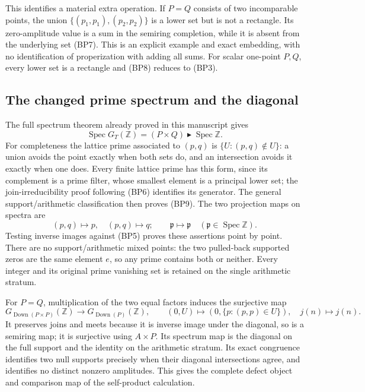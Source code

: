 \documentclass[11pt,a4paper]{article}
\theoremstyle{definition}\newtheorem{definition}[theorem]{Definition}
\begin{document}
This identifies a material extra operation. If $P=Q$ consists of
two incomparable points, the union
$\{(p_1,p_1),(p_2,p_2)\}$ is a lower set but is not a rectangle.
Its zero-amplitude value is a sum in the semiring completion, while
it is absent from the underlying set (BP7). This is an explicit
example and exact embedding, with no identification of properization
with adding all sums. For scalar one-point $P,Q$, every lower set
is a rectangle and (BP8) reduces to (BP3).

\subsection{The changed prime spectrum and the diagonal}

The full spectrum theorem already proved in this manuscript gives
\[
 \operatorname{Spec}G_T(\mathbb Z)
     =(P\times Q)\mathbin{\blacktriangleright}\operatorname{Spec}\mathbb Z.
 \tag{BP9}
\]
For completeness the lattice prime associated to $(p,q)$ is
$\{U:(p,q)\notin U\}$: a union avoids the point exactly when
both sets do, and an intersection avoids it exactly when one does.
Every finite lattice prime has this form, since its complement is
a prime filter, whose smallest element is a principal lower set;
the join-irreducibility proof following (BP6) identifies its generator.
The general support/arithmetic classification then proves (BP9).
The two projection maps on spectra are
\[
 (p,q)\mapsto p,\quad (p,q)\mapsto q;
 \qquad \mathfrak p\mapsto\mathfrak p
       \quad(\mathfrak p\in\operatorname{Spec}\mathbb Z).
 \tag{BP10}
\]
Testing inverse images against (BP5) proves these assertions point
by point. There are no support/arithmetic mixed points: the two
pulled-back supported zeros are the same element $e$, so any prime
contains both or neither. Every integer and its original prime
vanishing set is retained on the single arithmetic stratum.

For $P=Q$, multiplication of the two equal factors induces the
surjective map
\[
 G_{\operatorname{Down}(P\times P)}(\mathbb Z)
       \longrightarrow G_{\operatorname{Down}(P)}(\mathbb Z),
 \qquad (0,U)\mapsto(0,\{p:(p,p)\in U\}),
 \quad j(n)\mapsto j(n).
 \tag{BP11}
\]
It preserves joins and meets because it is inverse image under
the diagonal, so is a semiring map; it is surjective using $A\times P$.
Its spectrum map is the diagonal on the full support and the identity
on the arithmetic stratum. Its exact congruence identifies two null
supports precisely when their diagonal intersections agree, and
identifies no distinct nonzero amplitudes. This gives the complete
defect object and comparison map of the self-product calculation.
\end{document}

